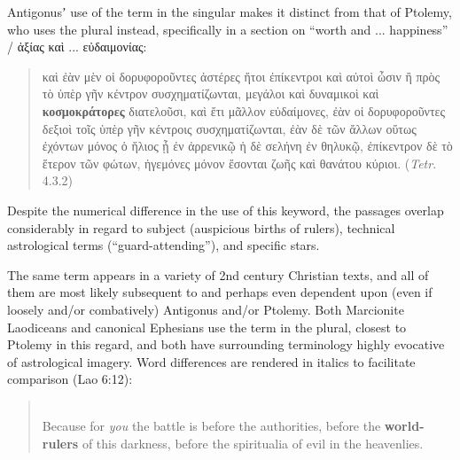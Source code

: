 \noindent{}Antigonusʼ use of the term in the singular makes it distinct from that of Ptolemy, %
who uses the plural instead, specifically in a section on %
“worth and ... happiness” / ἀξίας καὶ ... εὐδαιμονίας: %

\vspace*{2mm} 
 \begin{quote}καὶ ἐὰν μὲν οἱ δορυφοροῦντες ἀστέρες ἤτοι ἐπίκεντροι καὶ %
 αὐτοὶ ὦσιν ἢ πρὸς τὸ ὑπὲρ γῆν κέντρον συσχηματίζωνται, %
 μεγάλοι καὶ δυναμικοὶ καὶ \textbf{κοσμοκράτορες} διατελοῦσι, %
 καὶ ἔτι μᾶλλον εὐδαίμονες, %
 ἐὰν οἱ δορυφοροῦντες δεξιοὶ τοῖς ὑπὲρ γῆν κέντροις συσχηματίζωνται, %
 ἐὰν δὲ τῶν ἄλλων οὕτως ἐχόντων μόνος ὁ ἥλιος ᾖ ἐν ἀρρενικῷ ἡ δὲ σελήνη ἐν θηλυκῷ, %
 ἐπίκεντρον δὲ τὸ ἕτερον τῶν φώτων, %
 ἡγεμόνες μόνον ἔσονται ζωῆς καὶ θανάτου κύριοι. (\textit{Tetr}. 4.3.2) \\[1mm] %
 \end{quote} %
\vspace*{2mm}

\noindent{}Despite the numerical difference in the use of this keyword, %
the passages overlap considerably in regard to subject (auspicious births of rulers), %
technical astrological terms (“guard-attending”), %
and specific stars. %

The same term appears in a variety of 2nd century Christian texts, %
and all of them are most likely subsequent to and perhaps even dependent upon %
(even if loosely and/or combatively) Antigonus and/or Ptolemy. %
Both Marcionite Laodiceans and canonical Ephesians use %
the term in the plural, closest to Ptolemy in this regard, %
and both have surrounding terminology highly evocative of astrological imagery. %
Word differences are rendered in italics to facilitate comparison (Lao 6:12): %

\vspace*{3mm} 
 \begin{quote} \\[1mm] %
  Because for \textit{you} the battle is before the authorities, %
  before the \textbf{world-rulers} of this darkness, %
  before the spiritualia of evil in the heavenlies. %
  \end{quote} %
 \vspace*{1.5mm}


